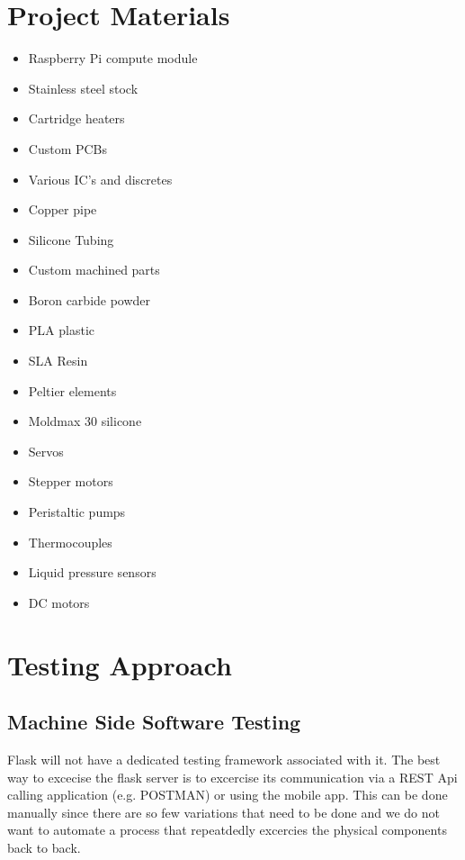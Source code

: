\documentclass[conference]{IEEEtran}
\begin{document}
\begin{itemize}
\section{Project Materials}
\begin{itemize}
\item Raspberry Pi compute module
\item Stainless steel stock
\item Cartridge heaters
\item Custom PCBs
\item Various IC's and discretes %
\item Copper pipe
\item Silicone Tubing
\item Custom machined parts
\item Boron carbide powder
\item PLA plastic
\item SLA Resin
\item Peltier elements
\item Moldmax 30 silicone
\item Servos
\item Stepper motors
\item Peristaltic pumps
\item Thermocouples
\item Liquid pressure sensors
\item DC motors
\end{itemize}


\section{Testing Approach}

\subsection{Machine Side Software Testing}
Flask will not have a dedicated testing framework associated with it. The best way to excecise the flask server
is to excercise its communication via a REST Api calling application (e.g. POSTMAN) or using the mobile app. This can be done
manually since there are so few variations that need to be done and we do not want to automate a process that repeatdedly excercies
the physical components back to back.


\end{itemize}
\end{document}
